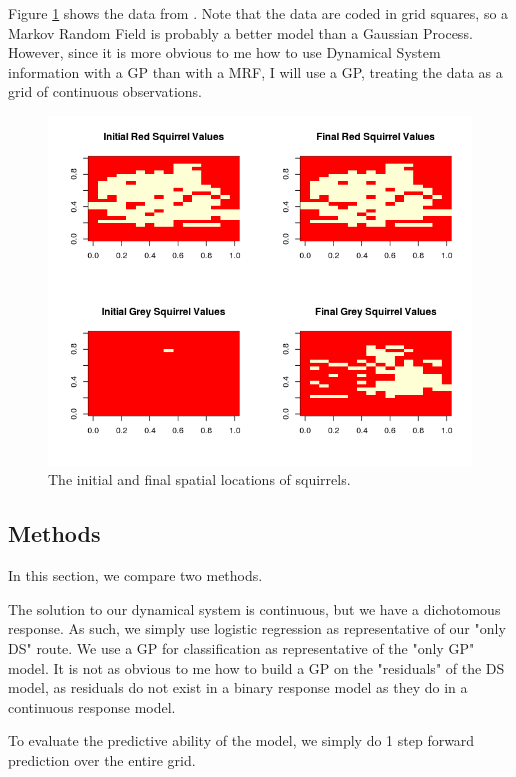 \documentclass{article}
\begin{document}
	Figure \ref{fig11} shows the data from \cite{reynolds1985details}. Note that the data are coded in grid squares, so a Markov Random Field is probably a better model than a Gaussian Process. However, since it is more obvious to me how to use Dynamical System information with a GP than with a MRF, I will use a GP, treating the data as a grid of continuous observations.
	
	\begin{figure}[H]
		\includegraphics[scale=0.6]{FinalImage5.png}
		\caption{The initial and final spatial locations of squirrels.}
		\label{fig11}
	\end{figure}
	
	\subsection{Methods}
	
	In this section, we compare two methods.
	
	The solution to our dynamical system is continuous, but we have a dichotomous response. As such, we simply use logistic regression as representative of our "only DS" route. We use a GP for classification as representative of the "only GP" model. It is not as obvious to me how to build a GP on the "residuals" of the DS model, as residuals do not exist in a binary response model as they do in a continuous response model.
	
	To evaluate the predictive ability of the model, we simply do 1 step forward prediction over the entire grid.
	
\end{document}
